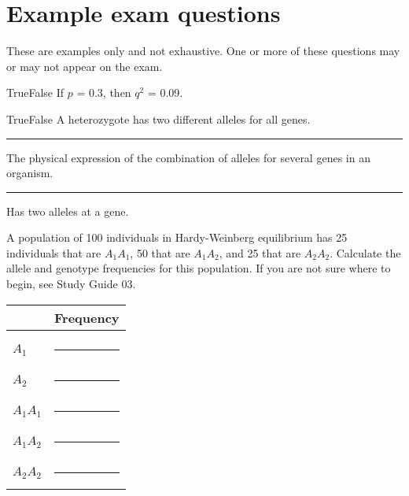 \documentclass[letterpaper]{tufte-handout}
\begin{document}
\section*{Example exam questions}

These are examples only and not exhaustive. One or more of these questions may or may not appear on the exam.

\bigskip

\noindent True\hspace{1em}False\hspace{1em} If $p$ = 0.3, then $q^2$ = 0.09.

\bigskip 

\noindent True\hspace{1em}False\hspace{1em} A heterozygote has two different alleles for all genes.

\bigskip

\noindent \rule{1in}{0.4pt} The physical expression of the combination of alleles for several genes in an organism.

\bigskip

\noindent \rule{1in}{0.4pt} Has two alleles at a gene.

\bigskip

\noindent A population of 100 individuals in Hardy-Weinberg equilibrium
has 25 individuals that are $A_1A_1$, 50 that are $A_1A_2$, and 25 
that are $A_2A_2$. Calculate the allele and genotype frequencies 
for this population. If you are not sure where to begin, see Study Guide 03.

\bigskip

\begin{tabular}{@{}ll@{}}
	\toprule
	& Frequency\tabularnewline
	\midrule
	& \tabularnewline
	$A_1$		&	\rule{0.6in}{0.4pt}\tabularnewline[2em]
	$A_2$		&	\rule{0.6in}{0.4pt}\tabularnewline[2em]
	$A_1A_1$	&	\rule{0.6in}{0.4pt}\tabularnewline[2em]
	$A_1A_2$	&	\rule{0.6in}{0.4pt}\tabularnewline[2em]
	$A_2A_2$	&	\rule{0.6in}{0.4pt}\tabularnewline
	\bottomrule
\end{tabular}


\end{document}
